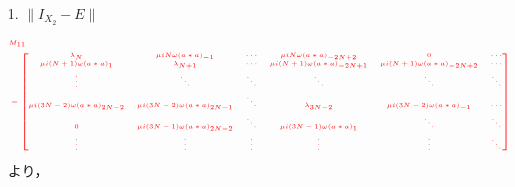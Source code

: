 \documentclass[11pt,a4paper,titlepage]{jsreport}
\theoremstyle{definition}
\providecommand{\DIFdel}[1]{{\protect\color{red} \scriptsize #1}} %
\begin{document}
\begin{enumerate}%
\item[\DIFdel{1. $\|I_{X_2} - E \|$}]%

\begin{displaymath}
  \DIFdel{\tiny
  \begin{split}
    &M_{11}\\
    &=\begin{bmatrix}
      \lambda_{N} & \mu i N \omega (a*a)_{-1} & \cdots & \mu i N \omega (a*a)_{-2N+2} & 0 & \cdots \\
      \mu i (N+1) \omega (a*a)_{1} & \lambda_{N+1} & \cdots & \mu i (N+1) \omega (a*a)_{-2N+1} & \mu i (N+1) \omega (a*a)_{-2N+2} & \cdots \\
      \vdots & \ddots & \ddots & \ddots & \ddots & \ddots \\
      \mu i (3N-2) \omega (a*a)_{2N-2} & \mu i (3N-2) \omega (a*a)_{2N-1} & \ddots & \lambda_{3N-2} & \mu i (3N-2) \omega (a*a)_{-1} & \cdots \\
      0 & \mu i (3N-1) \omega (a*a)_{2N-2} & \ddots & \mu i (3N-1) \omega (a*a)_{1} & \ddots & \ddots \\
      \vdots & \vdots & \vdots & \vdots & \vdots & \ddots \\
    \end{bmatrix}
  \end{split}
}\end{displaymath}%
\DIFdel{より，
}%


\end{enumerate}
\end{document}
